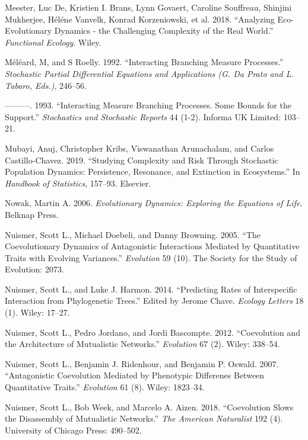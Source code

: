\documentclass[]{article}
\begin{document}
\leavevmode\hypertarget{ref-DeMeester2018}{}%
Meester, Luc De, Kristien I. Brans, Lynn Govaert, Caroline Souffreau,
Shinjini Mukherjee, Héléne Vanvelk, Konrad Korzeniowski, et al. 2018.
``Analyzing Eco-Evolutionary Dynamics - the Challenging Complexity of
the Real World.'' \emph{Functional Ecology}. Wiley.

\leavevmode\hypertarget{ref-meleard1992interacting}{}%
Méléard, M, and S Roelly. 1992. ``Interacting Branching Measure
Processes.'' \emph{Stochastic Partial Differential Equations and
Applications (G. Da Prato and L. Tubaro, Eds.)}, 246--56.

\leavevmode\hypertarget{ref-Mlard1993}{}%
---------. 1993. ``Interacting Measure Branching Processes. Some Bounds
for the Support.'' \emph{Stochastics and Stochastic Reports} 44 (1-2).
Informa UK Limited: 103--21.

\leavevmode\hypertarget{ref-Mubayi2019}{}%
Mubayi, Anuj, Christopher Kribs, Viswanathan Arunachalam, and Carlos
Castillo-Chavez. 2019. ``Studying Complexity and Risk Through Stochastic
Population Dynamics: Persistence, Resonance, and Extinction in
Ecosystems.'' In \emph{Handbook of Statistics}, 157--93. Elsevier.

\leavevmode\hypertarget{ref-9780674023383}{}%
Nowak, Martin A. 2006. \emph{Evolutionary Dynamics: Exploring the
Equations of Life}. Belknap Press.

\leavevmode\hypertarget{ref-Nuismer2005}{}%
Nuismer, Scott L., Michael Doebeli, and Danny Browning. 2005. ``The
Coevolutionary Dynamics of Antagonistic Interactions Mediated by
Quantitative Traits with Evolving Variances.'' \emph{Evolution} 59 (10).
The Society for the Study of Evolution: 2073.

\leavevmode\hypertarget{ref-Nuismer2014}{}%
Nuismer, Scott L., and Luke J. Harmon. 2014. ``Predicting Rates of
Interspecific Interaction from Phylogenetic Trees.'' Edited by Jerome
Chave. \emph{Ecology Letters} 18 (1). Wiley: 17--27.

\leavevmode\hypertarget{ref-Nuismer2012}{}%
Nuismer, Scott L., Pedro Jordano, and Jordi Bascompte. 2012.
``Coevolution and the Architecture of Mutualistic Networks.''
\emph{Evolution} 67 (2). Wiley: 338--54.

\leavevmode\hypertarget{ref-Nuismer2007}{}%
Nuismer, Scott L., Benjamin J. Ridenhour, and Benjamin P. Oswald. 2007.
``Antagonistic Coevolution Mediated by Phenotypic Differenes Between
Quantitative Traits.'' \emph{Evolution} 61 (8). Wiley: 1823--34.

\leavevmode\hypertarget{ref-Nuismer2018}{}%
Nuismer, Scott L., Bob Week, and Marcelo A. Aizen. 2018. ``Coevolution
Slows the Disassembly of Mutualistic Networks.'' \emph{The American
Naturalist} 192 (4). University of Chicago Press: 490--502.
\end{document}
